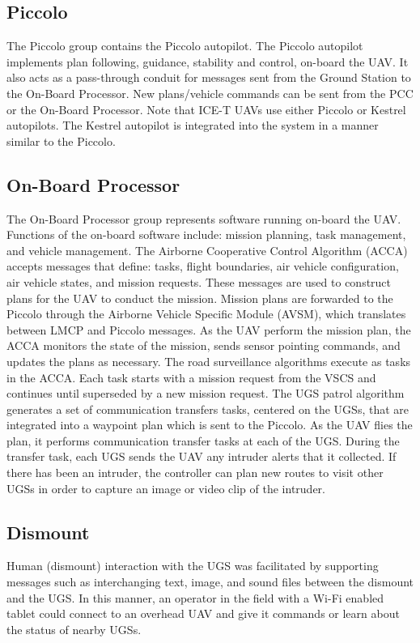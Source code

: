 \documentclass[letterpaper, 12 pt, conference]{ieeeconf}  %
\theoremstyle{definition}
\begin{document}
\subsection{Piccolo}
The Piccolo group contains the Piccolo autopilot. The Piccolo autopilot implements plan following, guidance, stability and control, on-board the UAV. It also acts as a pass-through conduit for messages sent from the Ground Station to the On-Board Processor. New plans/vehicle commands can be sent from the PCC or the On-Board Processor. Note that ICE-T UAVs use either Piccolo or Kestrel autopilots. The Kestrel autopilot is integrated into the system in a manner similar to the Piccolo.

\subsection{On-Board Processor}
The On-Board Processor group represents software running on-board the UAV. Functions of the on-board software include: mission planning, task management, and vehicle management. The Airborne Cooperative Control Algorithm (ACCA) accepts messages that define: tasks, flight boundaries, air vehicle configuration, air vehicle states, and mission requests. These messages are used to construct plans for the UAV to conduct the mission. Mission plans are forwarded to the Piccolo through the Airborne Vehicle Specific Module (AVSM), which translates between LMCP and Piccolo messages. As the UAV perform the mission plan, the ACCA monitors the state of the mission, sends sensor pointing commands, and updates the plans as necessary.
The road surveillance algorithms execute as tasks in the ACCA. Each task starts with a mission request from the VSCS and continues until superseded by a new mission request. The UGS patrol algorithm generates a set of communication transfers tasks, centered on the UGSs, that are integrated into a waypoint plan which is sent to the Piccolo. As the UAV flies the plan, it performs communication transfer tasks at each of the UGS. During the transfer task, each UGS sends the UAV any intruder alerts that it collected. If there has been an intruder, the controller can plan new routes to visit other UGSs in order to capture an image or video clip of the intruder.

\subsection{Dismount}
Human (dismount) interaction with the UGS was facilitated by supporting messages such as interchanging text, image, and sound files between the dismount and the UGS. In this manner, an operator in the field with a Wi-Fi enabled tablet could connect to an overhead UAV and give it commands or learn about the status of nearby UGSs.
\end{document}
